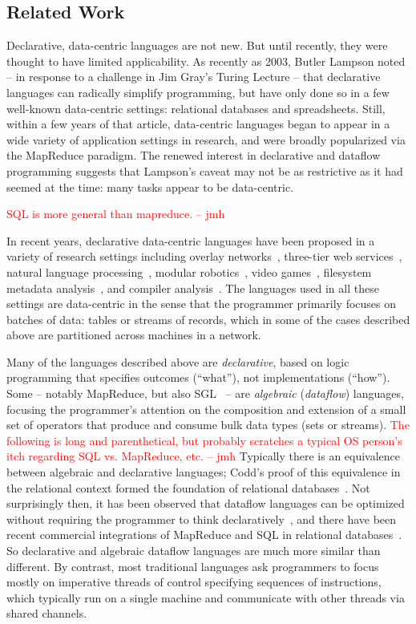 \documentclass{sig-alternate}
\newcommand{\jmh}[1]{{\textcolor{red}{#1 -- jmh}}}
\begin{document}
\subsection{Related Work}
\label{sec:relwork}
Declarative, data-centric languages are not new.  But until recently, they were thought to have limited applicability.  As recently as 2003, Butler Lampson noted -- in response to a challenge in Jim Gray's Turing Lecture -- that declarative languages can radically simplify programming, but have only done so in a few well-known data-centric settings: relational databases and spreadsheets. Still, within a few years of that article, data-centric languages began to appear in a wide variety of application settings in research, and were broadly popularized via the MapReduce paradigm. The renewed interest in declarative and dataflow programming suggests that Lampson's caveat may not be as restrictive as it had seemed at the time: many tasks appear to be data-centric.

\jmh{SQL is more general than mapreduce.}

In recent years, declarative data-centric languages have been proposed in a variety of research settings including overlay networks~\cite{p2}, three-tier web services~\cite{hilda}, natural language processing~\cite{dyna}, modular robotics~\cite{meld}, video games~\cite{cornellgames}, filesystem metadata analysis~\cite{wiscfsck}, and compiler analysis~\cite{bddbddb}.  The languages used in all these settings are data-centric in the sense that the programmer primarily focuses on batches of data: tables or streams of records, which in some of the cases described above are partitioned across machines in a network.  

Many of the languages described above are {\em declarative}, based on logic programming that specifies outcomes (``what''), not implementations (``how'').  Some -- notably MapReduce, but also SGL~\cite{cornellgames} -- are {\em algebraic} ({\em dataflow}) languages, focusing the programmer's attention on the composition and extension of a small set of operators that produce and consume bulk data types (sets or streams).  \jmh{The following is long and parenthetical, but probably scratches a typical OS person's itch regarding SQL vs. MapReduce, etc.}  Typically there is an equivalence between algebraic and declarative languages; Codd's proof of this equivalence in the relational context formed the foundation of relational databases~\cite{Codd70}. Not surprisingly then, it has been observed that dataflow languages can be optimized without requiring the programmer to think declaratively~\cite{volcano,cornellgames}, and there have been recent commercial integrations of MapReduce and SQL in relational databases~\cite{greenplum,aster}.  So declarative and algebraic dataflow languages are much more similar than different. By contrast, most traditional languages ask programmers to focus mostly on imperative threads of control specifying sequences of instructions, which typically run on a single machine and communicate with other threads via shared channels.
\end{document}
